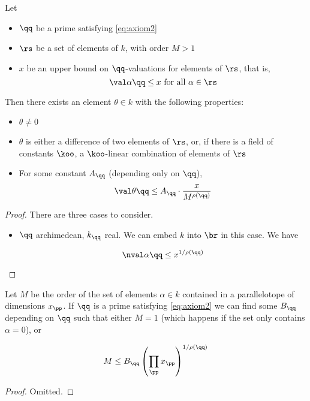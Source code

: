 \begin{lemma}
  Let
  \begin{itemize}
  \item $\qq$ be a prime satisfying \ref{eq:axiom2}
  \item $\rs$ be a set of elements of $k$, with order $M>1$
  \item $x$ be an upper bound on $\qq$-valuations for elements of $\rs$, that is,
    \[ \val\alpha\qq \leq x \text{ for all } \alpha\in\rs \]
  \end{itemize}
  Then there exists an element $\theta\in k$ with the following properties:
  \begin{itemize}
  \item $\theta\neq 0$
  \item $\theta$ is either a difference of two elements of $\rs$, or, if there
    is a field of constants $\koo$, a $\koo$-linear combination of elements of $\rs$
  \item For some constant $A_\qq$ (depending only on $\qq$),
    \[ \val\theta\qq \leq A_\qq \cdot \frac x{M^{\rho(\qq)}} \]
  \end{itemize}
\end{lemma}

\begin{proof}
  There are three cases to consider.
  \begin{itemize}
  \item $\qq$ archimedean, $k_\qq$ real. We can embed $k$ into $\br$ in this
    case. We have

    \[ \nval \alpha \qq \leq x^{1/\rho(\qq)} \]

  \end{itemize}
\end{proof}

\begin{lemma}
  Let $M$ be the order of the set of elements $\alpha\in k$ contained in a
  parallelotope of dimensions $x_\pp$. If $\qq$ is a prime satisfying
  \ref{eq:axiom2} we can find some $B_\qq$ depending on $\qq$ such that either $M =
  1$ (which happens if the set only contains $\alpha=0$), or

  \[ M \leq B_\qq  \left( \prod_\pp x_\pp \right) ^{1/\rho(\qq)} \]
\end{lemma}

\begin{proof}
  Omitted.
\end{proof}

